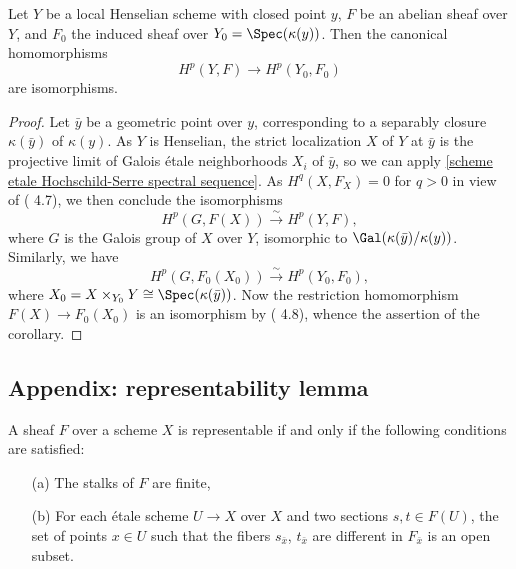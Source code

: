 \begin{corollary}\label{scheme local Henselian etale cohomology to closed point}
Let $Y$ be a local Henselian scheme with closed point $y$, $F$ be an abelian sheaf over $Y$, and $F_0$ the induced sheaf over $Y_0=\Spec(\kappa(y))$. Then the canonical homomorphisms
\[H^p(Y,F)\to H^p(Y_0,F_0)\]
are isomorphisms.
\end{corollary}
\begin{proof}
Let $\bar{y}$ be a geometric point over $y$, corresponding to a separably closure $\kappa(\bar{y})$ of $\kappa(y)$. As $Y$ is Henselian, the strict localization $X$ of $Y$ at $\bar{y}$ is the projective limit of Galois \'etale neighborhoods $X_i$ of $\bar{y}$, so we can apply \cref{scheme etale Hochschild-Serre spectral sequence}. As $H^q(X,F_X)=0$ for $q>0$ in view of (\cite{SGA4-2}  4.7), we then conclude the isomorphisms
\[H^p(G,F(X)) \stackrel{\sim}{\to} H^p(Y,F),\]
where $G$ is the Galois group of $X$ over $Y$, isomorphic to $\Gal(\kappa(\bar{y})/\kappa(y))$. Similarly, we have
\[H^p(G,F_0(X_0)) \stackrel{\sim}{\to} H^p(Y_0,F_0),\]
where $X_0=X\times_{Y_0}Y\cong\Spec(\kappa(\bar{y}))$. Now the restriction homomorphism $F(X)\to F_0(X_0)$ is an isomorphism by (\cite{SGA4-2}  4.8), whence the assertion of the corollary.
\end{proof}
\subsection{Appendix: representability lemma}
\begin{lemma}\label{scheme etale representability lemma}
A sheaf $F$ over a scheme $X$ is representable if and only if the following conditions are satisfied:
\begin{enumerate}
    \item[(a)] The stalks of $F$ are finite,
    \item[(b)] For each \'etale scheme $U\to X$ over $X$ and two sections $s,t\in F(U)$, the set of points $x\in U$ such that the fibers $s_{\bar{x}}$, $t_{\bar{x}}$ are different in $F_{\bar{x}}$ is an open subset.
\end{enumerate}
\end{lemma}

